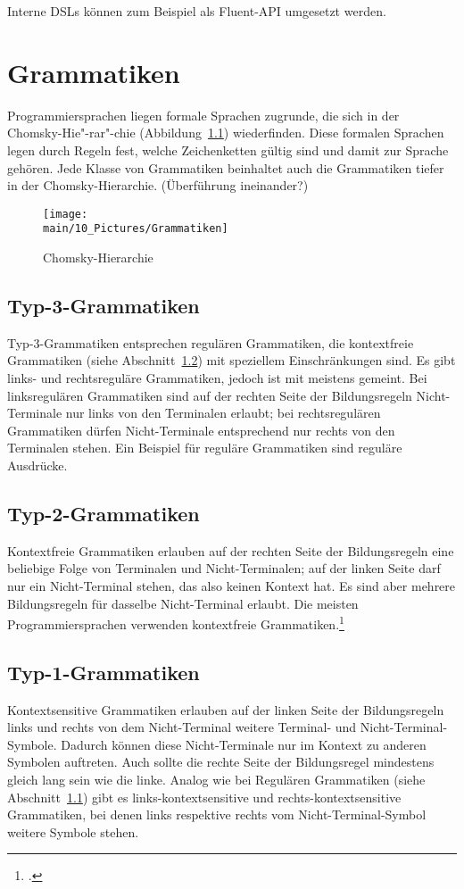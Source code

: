 \documentclass[../InterneDSLs.tex]{subfiles}
\begin{document}
Interne DSLs können zum Beispiel als Fluent-\acs{API} umgesetzt werden.


\chapter{Grammatiken}
Programmiersprachen liegen formale Sprachen zugrunde, die sich in der Chomsky-Hie"-rar"-chie (Abbildung~\ref{fig:chomkskyhierarchie}) wiederfinden. Diese formalen Sprachen legen durch Regeln fest, welche Zeichenketten gültig sind und damit zur Sprache gehören. Jede Klasse von Grammatiken beinhaltet auch die Grammatiken tiefer in der Chomsky-Hierarchie. (Überführung ineinander?)

\begin{figure}
\centering
\texttt{[image: \\main/10\_Pictures/Grammatiken]}
\caption{Chomsky-Hierarchie}
\label{fig:chomkskyhierarchie}
\end{figure}

\section{Typ-3-Grammatiken}\label{sec:refulaeregrammatik}
Typ-3-Grammatiken entsprechen regulären Grammatiken, die kontextfreie Grammatiken (siehe Abschnitt~\ref{sec:kontextfreiegrammatik}) mit speziellem Einschränkungen sind. Es gibt links- und rechtsreguläre Grammatiken, jedoch ist mit  meistens  gemeint. Bei linksregulären Grammatiken sind auf der rechten Seite der Bildungsregeln Nicht-Terminale nur links von den Terminalen erlaubt; bei rechtsregulären Grammatiken dürfen Nicht-Terminale entsprechend nur rechts von den Terminalen stehen. Ein Beispiel für reguläre Grammatiken sind reguläre Ausdrücke.

\section{Typ-2-Grammatiken}\label{sec:kontextfreiegrammatik}
Kontextfreie Grammatiken erlauben auf der rechten Seite der Bildungsregeln eine beliebige Folge von Terminalen und Nicht-Terminalen; auf der linken Seite darf nur ein Nicht-Terminal stehen, das also keinen Kontext hat. Es sind aber mehrere Bildungsregeln für dasselbe Nicht-Terminal erlaubt. Die meisten Programmiersprachen verwenden kontextfreie Grammatiken.\footcite{Fowler.2010}

\section{Typ-1-Grammatiken}\label{sec:kontextsensitivegrammatik}
Kontextsensitive Grammatiken erlauben auf der linken Seite der Bildungsregeln links und rechts von dem Nicht-Terminal weitere Terminal- und Nicht-Terminal-Symbole. Dadurch können diese Nicht-Terminale nur im Kontext zu anderen Symbolen auftreten. Auch sollte die rechte Seite der Bildungsregel mindestens gleich lang sein wie die linke. Analog wie bei Regulären Grammatiken (siehe Abschnitt~\ref{sec:refulaeregrammatik}) gibt es links-kontextsensitive und rechts-kontextsensitive Grammatiken, bei denen links respektive rechts vom Nicht-Terminal-Symbol weitere Symbole stehen.
\end{document}
